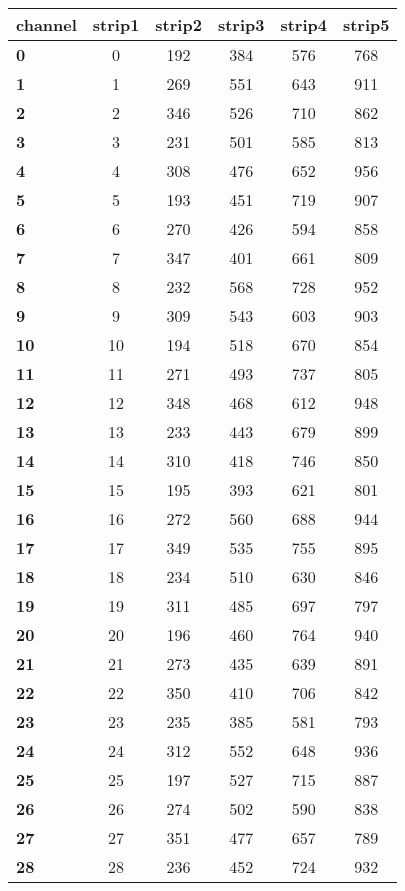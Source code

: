 \begin{longtable}{|l|c|c|c|c|c|}
  \hline
  \textbf{channel} & strip1 &strip2 & strip3 & strip4 & strip5 \\
  \hline 
  \textbf{0} & 0 &192 & 384 & 576 & 768 \\
  \textbf{1} & 1 &269 & 551 & 643 & 911 \\
  \textbf{2} & 2 &346 & 526 & 710 & 862 \\
  \textbf{3} & 3 &231 & 501 & 585 & 813 \\
  \textbf{4} & 4 &308 & 476 & 652 & 956 \\
  \textbf{5} & 5 &193 & 451 & 719 & 907 \\
  \textbf{6} & 6 &270 & 426 & 594 & 858 \\
  \textbf{7} & 7 &347 & 401 & 661 & 809 \\
  \textbf{8} & 8 &232 & 568 & 728 & 952 \\
  \textbf{9} & 9 &309 & 543 & 603 & 903 \\
  \textbf{10} & 10 &194 & 518 & 670 & 854 \\
  \textbf{11} & 11 &271 & 493 & 737 & 805 \\
  \textbf{12} & 12 &348 & 468 & 612 & 948 \\
  \textbf{13} & 13 &233 & 443 & 679 & 899 \\
  \textbf{14} & 14 &310 & 418 & 746 & 850 \\
  \textbf{15} & 15 &195 & 393 & 621 & 801 \\
  \textbf{16} & 16 &272 & 560 & 688 & 944 \\
  \textbf{17} & 17 &349 & 535 & 755 & 895 \\
  \textbf{18} & 18 &234 & 510 & 630 & 846 \\
  \textbf{19} & 19 &311 & 485 & 697 & 797 \\
  \textbf{20} & 20 &196 & 460 & 764 & 940 \\
  \textbf{21} & 21 &273 & 435 & 639 & 891 \\
  \textbf{22} & 22 &350 & 410 & 706 & 842 \\
  \textbf{23} & 23 &235 & 385 & 581 & 793 \\
  \textbf{24} & 24 &312 & 552 & 648 & 936 \\
  \textbf{25} & 25 &197 & 527 & 715 & 887 \\
  \textbf{26} & 26 &274 & 502 & 590 & 838 \\
  \textbf{27} & 27 &351 & 477 & 657 & 789 \\
  \textbf{28} & 28 &236 & 452 & 724 & 932 \\

\end{longtable}
